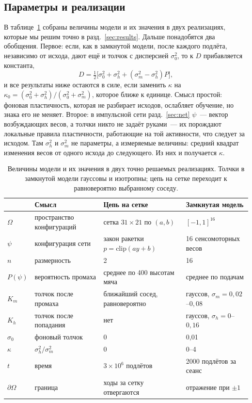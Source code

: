 \documentclass[pre,twocolumn,superscriptaddress,showpacs=false,amsmath,amssymb,nofootinbib]{revtex4-2}
\begin{document}
\subsection{Параметры и реализации}
В таблице~\ref{tab:params} собраны величины модели и их значения в двух реализациях, которые мы решим точно в разд.~\ref{sec:results}. Дальше понадобятся два обобщения. Первое: если, как в замкнутой модели, после каждого подлёта, независимо от исхода, дают ещё и толчок с дисперсией $\sigma_0^2$, то к $D$ прибавляется константа,
\begin{equation}
D=\tfrac12\bigl[\sigma_0^2+\sigma_h^2+(\sigma_m^2-\sigma_h^2)P\bigr],
\label{eq:D0}
\end{equation}
и все результаты ниже остаются в силе, если заменить $\kappa$ на $\kappa_0=(\sigma_0^2+\sigma_h^2)/(\sigma_0^2+\sigma_m^2)$, которое ближе к единице. Смысл простой: фоновая пластичность, которая не разбирает исходов, ослабляет обучение, но знака его не меняет. Второе: в импульсной сети разд.~\ref{sec:net} $\psi$~--- вектор возбуждающих весов, а толчки никто не задаёт руками~--- их порождают локальные правила пластичности, работающие на той активности, что следует за исходом. Там $\sigma_h^2$ и $\sigma_m^2$ не параметры, а измеряемые величины: средний квадрат изменения весов от одного исхода до следующего. Из них и получается $\kappa$.

\begin{table}[b]
\caption{Величины модели и их значения в двух точно решаемых реализациях. Толчки в замкнутой модели гауссовы и изотропны; цепь на сетке переходит к равновероятно выбранному соседу.}
\label{tab:params}
\footnotesize
\begin{ruledtabular}
\begin{tabular}{@{}lp{1.9cm}p{2.2cm}p{2.4cm}@{}}
 & Смысл & Цепь на сетке & Замкнутая модель \\
\hline
$\Omega$ & пространство конфигураций & сетка $31\times21$ по $(a,b)$ & $[-1,1]^{16}$ \\
$\psi$ & конфигурация сети & закон ракетки $p=\mathrm{clip}(ay+b)$ & 16 сенсомоторных весов \\
$n$ & размерность & 2 & 16 \\
$P(\psi)$ & вероятность промаха & среднее по 400 высотам мяча & среднее по подачам \\
$K_m$ & толчок после промаха & ближайший сосед, равновероятно & гауссов, $\sigma_m=0{,}02$--$0{,}08$ \\
$K_h$ & толчок после попадания & нет & гауссов, $\sigma_h=0$--$0{,}16$ \\
$\sigma_0$ & фоновый толчок & 0 & 0{,}01 \\
$\kappa$ & $\sigma_h^2/\sigma_m^2$ & 0 & 0--4 \\
$t$ & время & $3\times10^6$ подлётов & 2000 подлётов за сеанс \\
$\partial\Omega$ & граница & ходы за сетку отвергаются & отражение при $\pm1$ \\
\end{tabular}
\end{ruledtabular}
\end{table}
\end{document}

